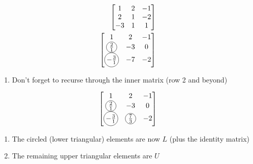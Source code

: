 \documentclass[10pt]{article}
\newcommand*\circled[1]{\tikz[baseline=(char.base)]{
    \node[shape=circle,draw,inner sep=0.5pt] (char) {#1};}}
\begin{document}
\begin{multicols}{2}
\begin{minipage}{\columnwidth}
    \begin{minipage}{0.5\linewidth}
        \begin{align}
            \begin{bmatrix}
                1 & 2 & -1 \\
                2 & 1 & -2 \\
                -3 & 1 & 1
            \end{bmatrix} \\
            \begin{bmatrix}
                1 & 2 & -1 \\
                \circled{\(\frac{2}{1}\)} & -3 & 0 \\
                \circled{\(-\frac{3}{1}\)} & -7 & -2
            \end{bmatrix}
        \end{align}
    \end{minipage}
    \begin{enumerate}[resume]
        \item Don't forget to recurse through the inner matrix (row 2 and beyond)
    \end{enumerate}
    \begin{minipage}{0.5\linewidth}
        \begin{align}
            \begin{bmatrix}
                1 & 2 & -1 \\
                \circled{\(\frac{2}{1}\)} & -3 & 0 \\
                \circled{\(-\frac{3}{1}\)} & \circled{\(\frac{7}{3}\)} & -2
            \end{bmatrix}
        \end{align}
    \end{minipage}
    \begin{enumerate}[resume]
        \item The circled (lower triangular) elements are now \(L\) (plus the identity matrix)
        \item The remaining upper triangular elements are \(U\)
    \end{enumerate}
\end{minipage}

\begin{minipage}{0.95\columnwidth}

\end{minipage}
\end{multicols}
\end{document}
